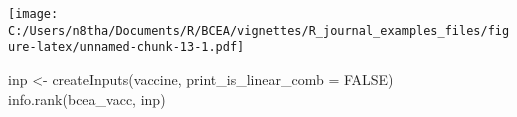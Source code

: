 \documentclass[
]{article}
\newenvironment{Shaded}{\begin{snugshade}}{\end{snugshade}}
\newcommand{\AttributeTok}[1]{\textcolor[rgb]{0.77,0.63,0.00}{#1}}
\newcommand{\ConstantTok}[1]{\textcolor[rgb]{0.00,0.00,0.00}{#1}}
\newcommand{\FunctionTok}[1]{\textcolor[rgb]{0.00,0.00,0.00}{#1}}
\newcommand{\NormalTok}[1]{#1}
\newcommand{\OtherTok}[1]{\textcolor[rgb]{0.56,0.35,0.01}{#1}}
\newcommand{\SpecialCharTok}[1]{\textcolor[rgb]{0.00,0.00,0.00}{#1}}
\newcommand{\StringTok}[1]{\textcolor[rgb]{0.31,0.60,0.02}{#1}}
\begin{document}
\texttt{[image: C:/Users/n8tha/Documents/R/BCEA/vignettes/R\_journal\_examples\_files/figure-latex/unnamed-chunk-13-1.pdf]}

\begin{Shaded}
\begin{Highlighting}[]
\NormalTok{inp }\OtherTok{\textless{}{-}} \FunctionTok{createInputs}\NormalTok{(vaccine, }\AttributeTok{print\_is\_linear\_comb =} \ConstantTok{FALSE}\NormalTok{)}
\FunctionTok{info.rank}\NormalTok{(bcea\_vacc, inp)}
\end{Highlighting}
\end{Shaded}

\begin{Shaded}
\end{Shaded}
\end{document}
